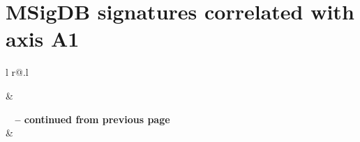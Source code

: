 \chapter{\acrshort{MSigDB} signatures correlated with axis A1}
\label{app:sigs-msigdb-corrs-axis1}
\begin{longtable}[!htbp]{ l r@{.}l }
\caption[\acrshort{MSigDB} signatures correlated with axis A1]{\acrshort{MSigDB} signatures substantially correlated with activity of the prognostic axis A1.}

\hline {} &  \\ \hline
\endfirsthead

{{\bfseries \tablename\ \thetable{} -- continued from previous page}} \\
\hline {} &  \\ \hline
\endhead

\hline {} \\
\endfoot

\hline \hline
\endlastfoot


\end{longtable}
